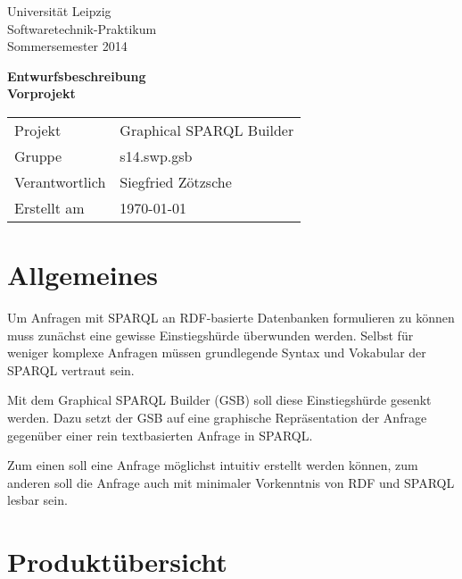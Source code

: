 \def\verantwortlicher{Siegfried Zötzsche} %
\thispagestyle{empty} 

\vspace*{2\baselineskip}

\begin{center}
\sffamily
Universität Leipzig\\
Softwaretechnik-Praktikum\\
Sommersemester 2014
\baselineskip

\bgroup
\Huge\textbf{Entwurfsbeschreibung\\ Vorprojekt}
\egroup
{}\baselineskip

\begin{tabular}{ll}
Projekt & Graphical SPARQL Builder \\
Gruppe & s14.swp.gsb \\
Verantwortlich & \verantwortlicher\\
Erstellt am & \today \\
\end{tabular}
\end{center}


\newpage

\tableofcontents

\pagebreak

\section{Allgemeines}

Um Anfragen mit SPARQL an RDF-basierte Datenbanken formulieren zu
können muss zunächst eine gewisse Einstiegshürde überwunden werden.
Selbst für weniger komplexe Anfragen müssen grundlegende Syntax und
Vokabular der SPARQL vertraut sein.

Mit dem Graphical SPARQL Builder (GSB) soll diese Einstiegshürde gesenkt
werden.
Dazu setzt der GSB auf eine graphische Repräsentation der Anfrage
gegenüber einer rein textbasierten Anfrage in SPARQL.

Zum einen soll eine Anfrage möglichst intuitiv erstellt werden können,
zum anderen soll die Anfrage auch mit minimaler Vorkenntnis von RDF
und SPARQL lesbar sein.

\section{Produktübersicht}

